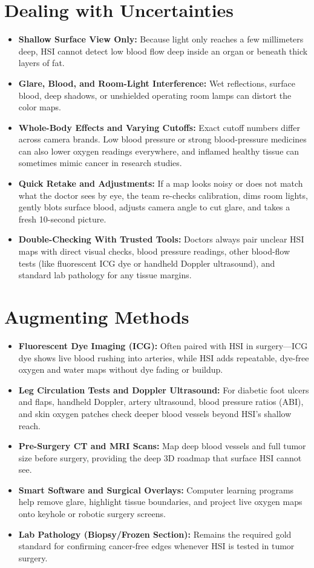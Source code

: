 \section{Dealing with Uncertainties}
\begin{itemize}
    \item \textbf{Shallow Surface View Only:} Because light only reaches a few millimeters deep, HSI cannot detect low blood flow deep inside an organ or beneath thick layers of fat.
    \item \textbf{Glare, Blood, and Room-Light Interference:} Wet reflections, surface blood, deep shadows, or unshielded operating room lamps can distort the color maps.
    \item \textbf{Whole-Body Effects and Varying Cutoffs:} Exact cutoff numbers differ across camera brands. Low blood pressure or strong blood-pressure medicines can also lower oxygen readings everywhere, and inflamed healthy tissue can sometimes mimic cancer in research studies.
    \item \textbf{Quick Retake and Adjustments:} If a map looks noisy or does not match what the doctor sees by eye, the team re-checks calibration, dims room lights, gently blots surface blood, adjusts camera angle to cut glare, and takes a fresh 10-second picture.
    \item \textbf{Double-Checking With Trusted Tools:} Doctors always pair unclear HSI maps with direct visual checks, blood pressure readings, other blood-flow tests (like fluorescent ICG dye or handheld Doppler ultrasound), and standard lab pathology for any tissue margins.
\end{itemize}

\section{Augmenting Methods}
\begin{itemize}
    \item \textbf{Fluorescent Dye Imaging (ICG):} Often paired with HSI in surgery---ICG dye shows live blood rushing into arteries, while HSI adds repeatable, dye-free oxygen and water maps without dye fading or buildup.
    \item \textbf{Leg Circulation Tests and Doppler Ultrasound:} For diabetic foot ulcers and flaps, handheld Doppler, artery ultrasound, blood pressure ratios (ABI), and skin oxygen patches check deeper blood vessels beyond HSI's shallow reach.
    \item \textbf{Pre-Surgery CT and MRI Scans:} Map deep blood vessels and full tumor size before surgery, providing the deep 3D roadmap that surface HSI cannot see.
    \item \textbf{Smart Software and Surgical Overlays:} Computer learning programs help remove glare, highlight tissue boundaries, and project live oxygen maps onto keyhole or robotic surgery screens.
    \item \textbf{Lab Pathology (Biopsy/Frozen Section):} Remains the required gold standard for confirming cancer-free edges whenever HSI is tested in tumor surgery.
\end{itemize}

